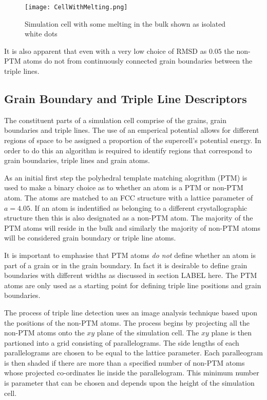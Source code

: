 \documentclass[12pt,a4paper]{book}
\begin{document}
\begin{figure}
	\centering
	\texttt{[image: CellWithMelting.png]} 
	\label{fig:CellMelt}
	\caption{Simulation cell with some melting in the bulk shown
	as isolated white dots}
\end{figure}

It is also apparent that even with a very low choice of RMSD as $0.05$ the non-PTM atoms do not from continuously connected grain boundaries between the triple lines. 


\subsection{Grain Boundary and Triple Line Descriptors}

The constituent parts of a simulation cell comprise of the grains, grain boundaries and triple lines. The use of an emperical potential allows for different regions of space to be assigned a proportion of the supercell's potential energy. In order to do this an algorithm is required to identify regions that correspond to grain boundaries, triple lines and grain atoms.

As an initial first step the polyhedral template matching alogrithm (PTM) is used to make a binary choice as to whether an atom is a PTM or non-PTM atom. The atoms are matched to an FCC structure with a lattice parameter of $a=4.05$. If an atom is indentified as belonging to a different crystallographic structure then this is also designated as a non-PTM atom. The majority of the PTM atoms will reside in the bulk and similarly the majority of non-PTM atoms will be considered grain boundary or triple line atoms. 

It is important to emphasise that PTM atoms \emph{do not} define whether an atom is part of a grain or in the grain boundary. In fact it is desirable to define grain boundaries with different widths as discussed in section LABEL here. The PTM atoms are only used as a starting point for defining triple line positions and grain boundaries.

The process of triple line detection uses an image analysis technique based upon the positions of the non-PTM atoms. The process begins by projecting all the non-PTM atoms onto the $xy$ plane of the simulation cell. The $xy$ plane is then partioned into a grid consisting of parallelograms. The side lengths of each parallelograms are chosen to be equal to the lattice parameter. Each paralleogram is then shaded if there are more than a specified number of non-PTM atoms whose projected co-ordinates lie inside the parallelogram. This minimum number is parameter that can be chosen and depends upon the height of the simulation cell.
\end{document}
